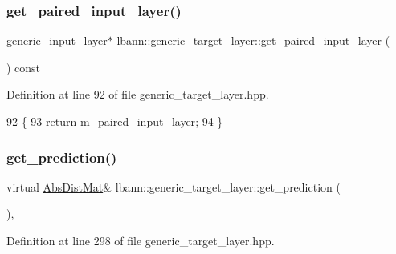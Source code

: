 \subsubsection{\texorpdfstring{get\+\_\+paired\+\_\+input\+\_\+layer()}{get\_paired\_input\_layer()}}
{\footnotesize\ttfamily \hyperlink{classlbann_1_1generic__input__layer}{generic\+\_\+input\+\_\+layer}$\ast$ lbann\+::generic\+\_\+target\+\_\+layer\+::get\+\_\+paired\+\_\+input\+\_\+layer (\begin{DoxyParamCaption}{ }\end{DoxyParamCaption}) const\hspace{0.3cm}{\ttfamily [inline]}}



Definition at line 92 of file generic\+\_\+target\+\_\+layer.\+hpp.


\begin{DoxyCode}
92                                                       \{
93     \textcolor{keywordflow}{return} \hyperlink{classlbann_1_1generic__target__layer_a84da1260e9feb4fbc3e6f2315e4cab4b}{m\_paired\_input\_layer};
94   \}
\end{DoxyCode}
\mbox{\label{classlbann_1_1generic__target__layer_ac0b88a705256ab06bbba6bbffbc7ebc1}} 
\subsubsection{\texorpdfstring{get\+\_\+prediction()}{get\_prediction()}\hspace{0.1cm}{\footnotesize\ttfamily [1/2]}}
{\footnotesize\ttfamily virtual \hyperlink{base_8hpp_a9a697a504ae84010e7439ffec862b470}{Abs\+Dist\+Mat}\& lbann\+::generic\+\_\+target\+\_\+layer\+::get\+\_\+prediction (\begin{DoxyParamCaption}{ }\end{DoxyParamCaption})\hspace{0.3cm}{\ttfamily [inline]}, {\ttfamily [virtual]}}



Definition at line 298 of file generic\+\_\+target\+\_\+layer.\+hpp.


